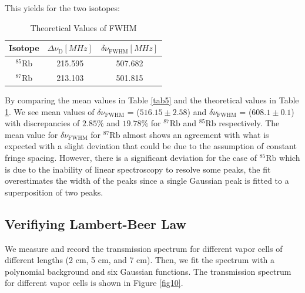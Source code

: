 \documentclass[12pt]{article}
\begin{document}
This yields for the two isotopes:

\begin{table}[h] \centering

\begin{tabular}{c|c|c} 
\hline
\hline
Isotope & $\Delta \nu_{\mathrm{D}} [MHz]$ & $\delta \nu_{\mathrm{FWHM}} [MHz]$ \\
\hline${ }^{85} \mathrm{Rb}$ & 215.595 & 507.682 \\
${ }^{87} \mathrm{Rb}$ & 213.103 & 501.815\\
\hline
\end{tabular}
\caption{Theoretical Values of FWHM}
\label{tab6}
\end{table}

By comparing the mean values in Table \ref{tab5} and the theoretical values in Table \ref{tab6}. We see mean values of $\delta \nu_{\mathrm{FWHM}} $ = ($516.15 \pm 2.58$) and $\delta \nu_{\mathrm{FWHM}} $ = ($608.1 \pm 0.1$) with discrepancies of $2.85 \%$ and $19.78 \%$ for $^{87} \mathrm{Rb}$ and $^{85} \mathrm{Rb}$ respectively. The mean value for $\delta \nu_{\mathrm{FWHM}} $ for $^{87} \mathrm{Rb}$ almost shows an agreement with what is expected with a slight deviation that could be due to the assumption of constant fringe spacing. However, there is a significant deviation for the case of $^{85} \mathrm{Rb}$ which is due to the inability of linear spectroscopy to resolve some peaks, the fit overestimates the width of the peaks since a single Gaussian peak is fitted to a superposition of two peaks. 

\subsection{Verifiying Lambert-Beer Law}

We measure and record the transmission spectrum for different vapor cells of different lengths (2 cm, 5 cm, and 7 cm). Then, we fit the spectrum with a polynomial background and six Gaussian functions. The transmission spectrum for different vapor cells is shown in Figure \ref{fig10}. 
\end{document}
